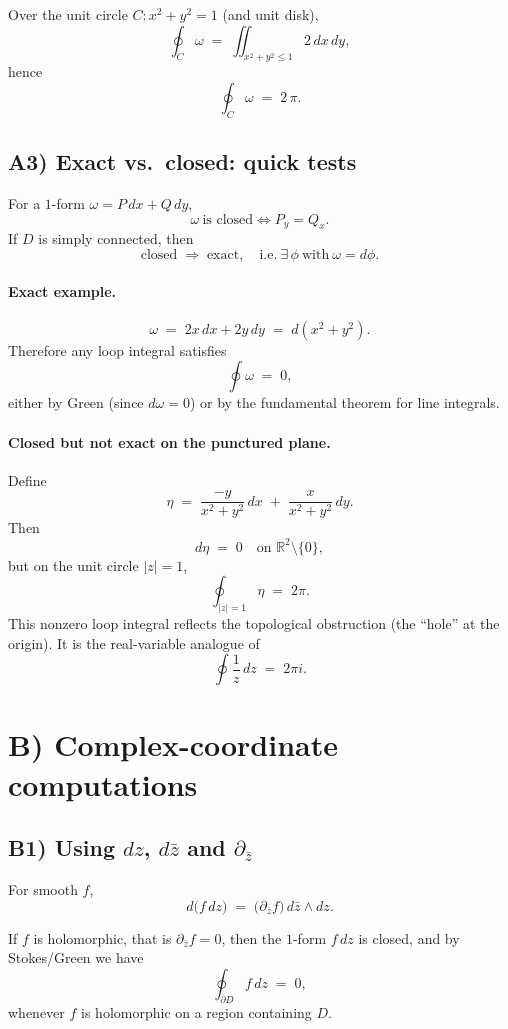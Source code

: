 \documentclass[11pt]{article}
\begin{document}
Over the unit circle $C: x^{2} + y^{2} = 1$ (and unit disk),
\[
\oint_{C} \omega \;=\; \iint_{x^{2} + y^{2} \le 1} 2\,dx\,dy,
\]
hence
\[
\oint_{C} \omega \;=\; 2\,\pi.
\]

\subsection*{A3) Exact vs.\ closed: quick tests}

For a $1$-form $\omega = P\,dx + Q\,dy$,
\[
\omega \ \text{is closed} \iff P_{y} = Q_{x}.
\]
If $D$ is simply connected, then
\[
\text{closed} \;\Rightarrow\; \text{exact}, \quad \text{i.e.}\ \exists\,\phi\ \text{with}\ \omega = d\phi.
\]

\paragraph{Exact example.}
\[
\omega \;=\; 2x\,dx + 2y\,dy \;=\; d(x^{2} + y^{2}).
\]
Therefore any loop integral satisfies
\[
\oint \omega \;=\; 0,
\]
either by Green (since $d\omega = 0$) or by the fundamental theorem for line integrals.

\paragraph{Closed but not exact on the punctured plane.}
Define
\[
\eta \;=\; \frac{-y}{x^{2} + y^{2}}\,dx \;+\; \frac{x}{x^{2} + y^{2}}\,dy.
\]
Then
\[
d\eta \;=\; 0 \quad \text{on } \mathbb{R}^{2}\setminus\{0\},
\]
but on the unit circle $|z|=1$,
\[
\oint_{|z|=1} \eta \;=\; 2\pi.
\]
This nonzero loop integral reflects the topological obstruction (the ``hole'' at the origin). It is the real-variable analogue of
\[
\oint \frac{1}{z}\,dz \;=\; 2\pi i.
\]

\section*{B) Complex-coordinate computations}

\subsection*{B1) Using $dz$, $d\bar z$ and $\partial_{\bar z}$}

For smooth $f$,
\[
d\bigl(f\,dz\bigr) \;=\; \bigl(\partial_{\bar z} f\bigr)\, d\bar z \wedge dz.
\]

If $f$ is holomorphic, that is $\partial_{\bar z} f = 0$, then the $1$-form $f\,dz$ is closed, and by Stokes/Green we have
\[
\oint_{\partial D} f\,dz \;=\; 0,
\]
whenever $f$ is holomorphic on a region containing $D$.
\end{document}

